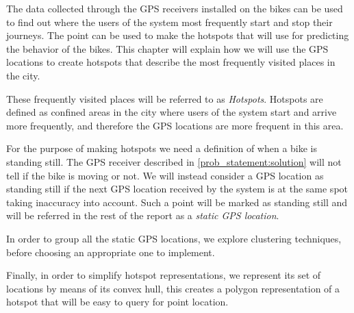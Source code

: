 The data collected through the GPS receivers installed on the bikes can be used to find out where the users of the system most frequently start and stop their journeys.
The point can be used to make the hotspots that \projectname{} will use for predicting the behavior of the bikes.
This chapter will explain how we will use the GPS locations to create hotspots that describe the most frequently visited places in the city.

These frequently visited places will be referred to as \emph{Hotspots}.
Hotspots are defined as confined areas in the city where users of the system start and arrive more frequently, and therefore the GPS locations are more frequent in this area.

For the purpose of making hotspots we need a definition of when a bike is standing still.
The GPS receiver described in \ref{prob_statement:solution} will not tell if the bike is moving or not.
We will instead consider a GPS location as standing still if the next GPS location received by the system is at the same spot taking inaccuracy into account.
Such a point will be marked as standing still and will be referred in the rest of the report as a \emph{static GPS location}.

In order to group all the static GPS locations, we explore clustering techniques, before choosing an appropriate one to implement.

Finally, in order to simplify hotspot representations, we represent its set of locations by means of its convex hull, this creates a polygon representation of a hotspot that will be easy to query for point location.